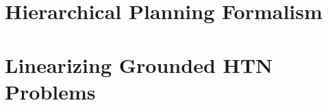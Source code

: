 \documentclass[letterpaper]{article} %
\begin{document}
 


\section{Hierarchical Planning Formalism}


\section{Linearizing Grounded HTN Problems}


 
 




\end{document}
